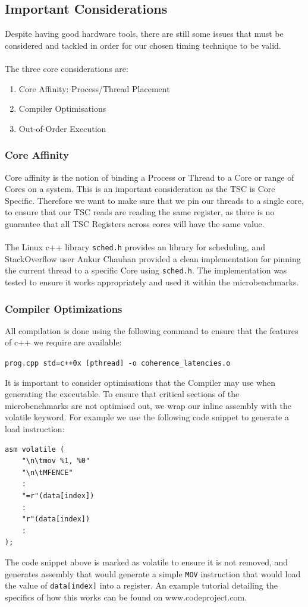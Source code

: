 \documentclass[bsc,frontabs,twoside,singlespacing,parskip,deptreport]{infthesis}     %
\begin{document}
\subsection{Important Considerations}
{
Despite having good hardware tools, there are still some issues that must be considered and tackled in order for our chosen timing technique to be valid. \\
\\
The three core considerations are:
\begin{enumerate}
    \item Core Affinity: Process/Thread Placement
    \item Compiler Optimisations
    \item Out-of-Order Execution
\end{enumerate}

\subsubsection{Core Affinity}
{
Core affinity is the notion of binding a Process or Thread to a Core or range of Cores on a system. This is an important consideration as the TSC is Core Specific. Therefore we want to make sure that we pin our threads to a single core, to ensure that our TSC reads are reading the same register, as there is no guarantee that all TSC Registers across cores will have the same value. \\
\\
The Linux c++ library \texttt{sched.h} provides an library for scheduling, and StackOverflow user Ankur Chauhan provided a clean implementation\cite{corepin_src} for pinning the current thread to a specific Core using \texttt{sched.h}. The implementation was tested to ensure it works appropriately and used it within the microbenchmarks.
}

\subsubsection{Compiler Optimizations}
{
All compilation is done using the following command to ensure that the features of c++ we require are available:
\begin{center}
    \texttt{prog.cpp \-std=c++0x [\-pthread] -o coherence\_latencies.o}
\end{center}
It is important to consider optimisations that the Compiler may use when generating the executable. To ensure that critical sections of the microbenchmarks are not optimised out, we wrap our inline assembly with the volatile keyword. For example we use the following code snippet to generate a load instruction:
\begin{verbatim}
asm volatile (
    "\n\tmov %1, %0"
    "\n\tMFENCE"
    :
    "=r"(data[index])
    :
    "r"(data[index])
    :
);
\end{verbatim}
The code snippet above is marked as volatile to ensure it is not removed, and generates assembly that would generate a simple \texttt{MOV} instruction that would load the value of \texttt{data[index]} into a register. An example tutorial detailing the specifics of how this works can be found on www.codeproject.com\cite{inline_asm_tut}.
}

}
\end{document}
